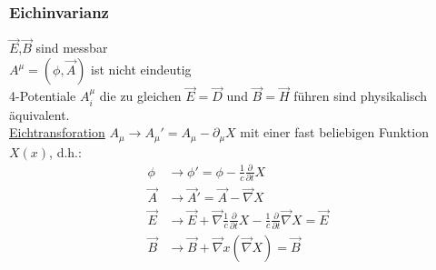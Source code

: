 \documentclass[a4paper]{article}
\begin{document}
\subsubsection{Eichinvarianz}
$\vec{E}$,$\vec{B}$ sind messbar\\
$A^\mu=(\phi,\vec{A})$ ist nicht eindeutig\\
4-Potentiale $A^\mu_i$ die zu gleichen $\vec{E}=\vec{D}$ und $\vec{B}=\vec{H}$
führen sind physikalisch äquivalent.\\
\underline{Eichtransforation} $A_\mu\rightarrow A_\mu'=A_\mu-\partial_\mu X$ mit
einer fast beliebigen Funktion $X(x)$, d.h.:\\
\begin{align}
\phi &\rightarrow \phi'=\phi-\frac{1}{c}\frac{\partial}{\partial t} X\\
\vec{A} &\rightarrow \vec{A}'=\vec{A}-\vec{\nabla}X\\
\vec{E}&\rightarrow\vec{E}+\vec{\nabla}\frac{1}{c}\frac{\partial}{\partial t}
X-\frac{1}{c}\frac{\partial}{\partial t} \vec{\nabla}X=\vec{E}\\
\vec{B}&\rightarrow\vec{B}+\vec{\nabla}x(\vec{\nabla}X)=\vec{B}
\end{align}
\end{document}
